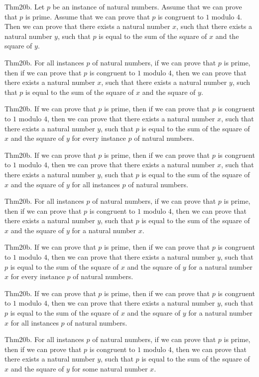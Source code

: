 \documentclass{article}
\begin{document}
Thm20b. Let $p$ be an instance of natural numbers. Assume that we can prove that $p$ is prime. Assume that we can prove that $p$ is congruent to $1$ modulo $4$. Then we can prove that there exists a natural number $x$, such that there exists a natural number $y$, such that $p$ is equal to the sum of the square of $x$ and the square of $y$.

Thm20b. For all instances $p$ of natural numbers, if we can prove that $p$ is prime, then if we can prove that $p$ is congruent to $1$ modulo $4$, then we can prove that there exists a natural number $x$, such that there exists a natural number $y$, such that $p$ is equal to the sum of the square of $x$ and the square of $y$.

Thm20b. If we can prove that $p$ is prime, then if we can prove that $p$ is congruent to $1$ modulo $4$, then we can prove that there exists a natural number $x$, such that there exists a natural number $y$, such that $p$ is equal to the sum of the square of $x$ and the square of $y$ for every instance $p$ of natural numbers.

Thm20b. If we can prove that $p$ is prime, then if we can prove that $p$ is congruent to $1$ modulo $4$, then we can prove that there exists a natural number $x$, such that there exists a natural number $y$, such that $p$ is equal to the sum of the square of $x$ and the square of $y$ for all instances $p$ of natural numbers.

Thm20b. For all instances $p$ of natural numbers, if we can prove that $p$ is prime, then if we can prove that $p$ is congruent to $1$ modulo $4$, then we can prove that there exists a natural number $y$, such that $p$ is equal to the sum of the square of $x$ and the square of $y$ for a natural number $x$.

Thm20b. If we can prove that $p$ is prime, then if we can prove that $p$ is congruent to $1$ modulo $4$, then we can prove that there exists a natural number $y$, such that $p$ is equal to the sum of the square of $x$ and the square of $y$ for a natural number $x$ for every instance $p$ of natural numbers.

Thm20b. If we can prove that $p$ is prime, then if we can prove that $p$ is congruent to $1$ modulo $4$, then we can prove that there exists a natural number $y$, such that $p$ is equal to the sum of the square of $x$ and the square of $y$ for a natural number $x$ for all instances $p$ of natural numbers.

Thm20b. For all instances $p$ of natural numbers, if we can prove that $p$ is prime, then if we can prove that $p$ is congruent to $1$ modulo $4$, then we can prove that there exists a natural number $y$, such that $p$ is equal to the sum of the square of $x$ and the square of $y$ for some natural number $x$.
\end{document}
